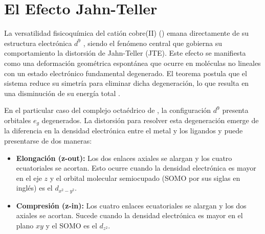 \section{El Efecto Jahn-Teller}

La versatilidad fisicoquímica del catión cobre(II) () emana directamente de su estructura electrónica \ce{[Ar]}$d^9$ , siendo el fenómeno central que gobierna su comportamiento la distorsión de Jahn-Teller (JTE). Este efecto se manifiesta como una deformación geométrica espontánea que ocurre en moléculas no lineales con un estado electrónico fundamental degenerado. El teorema postula que el sistema reduce su simetría para eliminar dicha degeneración, lo que resulta en una disminución de su energía total \cite{Cu-2019-01}.

En el particular caso del complejo octaédrico de , la configuración \ce{[Ar]}$d^9$ presenta orbitales $e_g$ degenerados. La distorsión para resolver esta degeneración emerge de la diferencia en la densidad electrónica entre el metal y los ligandos  y puede presentarse de dos maneras:
\begin{itemize}
    \item \textbf{Elongación (z-out):} Los dos enlaces axiales se alargan y los cuatro ecuatoriales se acortan. Esto ocurre cuando la densidad electrónica es mayor en el eje $z$ y el orbital molecular semiocupado (SOMO por sus siglas en inglés) es el $d_{x^2-y^2}$.
    \item \textbf{Compresión (z-in):} Los cuatro enlaces ecuatoriales se alargan y los dos axiales se acortan. Sucede cuando la densidad electrónica es mayor en el plano $xy$ y el SOMO es el $d_{z^2}$.
\end{itemize}


